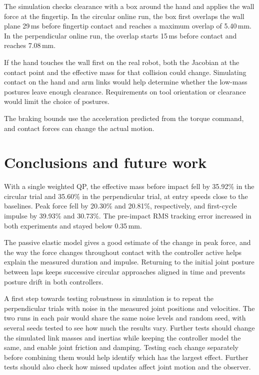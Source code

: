 \documentclass[11pt,a4paper]{article}
\begin{document}
The simulation checks clearance with a box around the hand and applies
the wall force at the fingertip. In the circular online run, the box first
overlaps the wall plane 29\,ms before fingertip contact and reaches a
maximum overlap of 5.40\,mm. In the perpendicular online run, the overlap
starts 15\,ms before contact and reaches 7.08\,mm.

If the hand touches the wall first on the real robot, both the Jacobian at
the contact point and the effective mass for that collision could change.
Simulating contact on the hand and arm links would help determine whether
the low-mass postures leave enough clearance. Requirements on tool
orientation or clearance would limit the choice of postures.

The braking bounds use the acceleration predicted from the torque
command, and contact forces can change the actual motion.

\section{Conclusions and future work}
With a single weighted QP, the effective mass before impact fell by
35.92\% in the circular trial and 35.60\% in the perpendicular trial, at
entry speeds close to the baselines. Peak force fell by
20.30\% and 20.81\%, respectively, and first-cycle impulse by 39.93\% and
30.73\%. The pre-impact RMS tracking error increased in both experiments
and stayed below 0.35\,mm.

The passive elastic model gives a good estimate of the change in peak
force, and the way the force changes throughout contact with the controller
active helps explain the measured duration and impulse. Returning to the
initial joint posture between laps keeps successive circular approaches
aligned in time and prevents posture drift in both controllers.

A first step towards testing robustness in simulation is to repeat the
perpendicular trials with noise in the measured joint positions and
velocities. The two runs in each pair would share the same noise levels
and random seed, with several seeds tested to see how much the results vary.
Further tests should change the simulated link masses and inertias while
keeping the controller model the same,
and enable joint friction and damping. Testing each change separately
before combining them would help identify which has the largest effect.
Further tests should also check how missed updates affect joint motion
and the observer.
\end{document}
